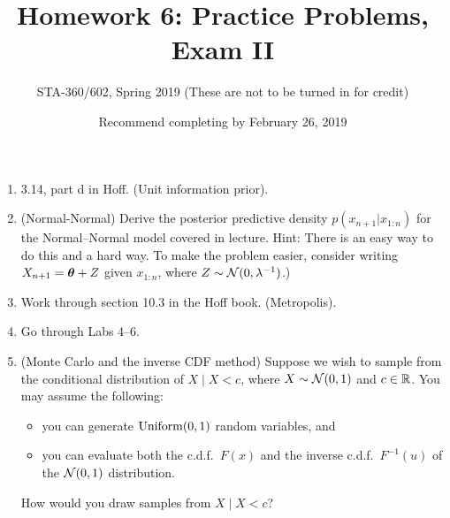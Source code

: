 \documentclass{article}
\begin{document}
\title{Homework 6: Practice Problems, Exam II}
\author{STA-360/602, Spring 2019 (These are not to be turned in for credit)}
\date{Recommend completing by February 26, 2019}
\maketitle




\begin{enumerate}
\item 3.14, part d in Hoff. (Unit information prior). 
\item (Normal-Normal)  Derive the posterior predictive density $p(x_{n +1}|x_{1:n})$ for the Normal--Normal model covered in lecture. Hint: There is an easy way to do this and a hard way. To make the problem easier, consider writing $X_{n+1} = {\bm\theta} + Z$ given $x_{1:n}$, where $Z\sim\mathcal{N}(0,\lambda^{-1})$.)
\item Work through section 10.3 in the Hoff book. (Metropolis). 
\item Go through Labs 4--6.
\item (Monte Carlo and the inverse CDF method) 
Suppose we wish to sample from the conditional distribution of $X\mid X<c$, where $X\sim\mathcal{N}(0,1)$ and $c\in \mathbb{R}$. You may assume the following:
\begin{itemize}
    \item you can generate $\operatorname*{Uniform}(0,1)$ random variables, and 
    \item you can evaluate both the c.d.f.\ $F(x)$ and the inverse c.d.f.\ $F^{-1}(u)$ of the $\mathcal{N}(0,1)$ distribution.
\end{itemize}
How would you draw samples from $X\mid X<c$?
\end{enumerate}
\end{document}
